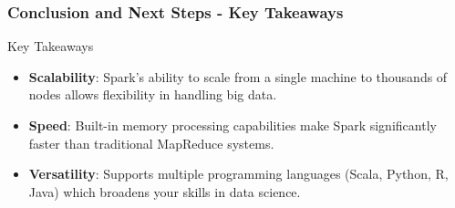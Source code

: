 \documentclass[aspectratio=169]{beamer}
\begin{document}
\begin{frame}[fragile]
    \frametitle{Conclusion and Next Steps - Key Takeaways}
    \begin{block}{Key Takeaways}
        \begin{itemize}
            \item \textbf{Scalability}: Spark's ability to scale from a single machine to thousands of nodes allows flexibility in handling big data.
            \item \textbf{Speed}: Built-in memory processing capabilities make Spark significantly faster than traditional MapReduce systems.
            \item \textbf{Versatility}: Supports multiple programming languages (Scala, Python, R, Java) which broadens your skills in data science.
        \end{itemize}
    \end{block}
\end{frame}
\end{document}
